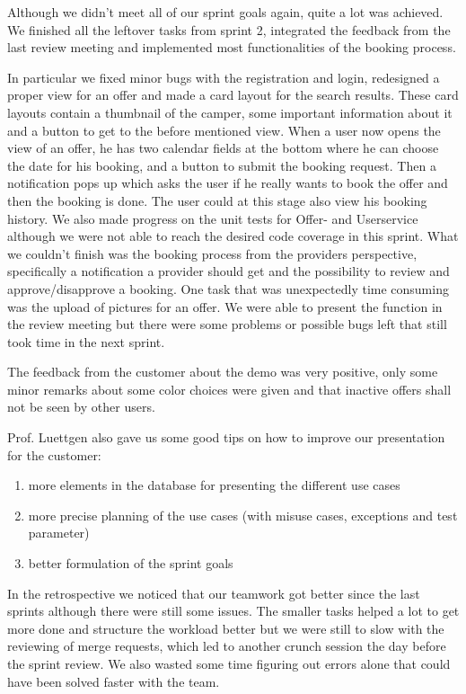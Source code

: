 Although we didn't meet all of our sprint goals again, quite a lot was achieved.
We finished all the leftover tasks from sprint 2, integrated the feedback from the last review meeting and implemented most functionalities of the booking process.

In particular we fixed minor bugs with the registration and login, redesigned a proper view for an offer and made a card layout for the search results.
These card layouts contain a thumbnail of the camper, some important information about it and a button to get to the before mentioned view.
When a user now opens the view of an offer, he has two calendar fields at the bottom where he can choose the date for his booking,
and a button to submit the booking request. Then a notification pops up which asks the user if he really wants to book the offer
and then the booking is done. The user could at this stage also view his booking history.
We also made progress on the unit tests for Offer- and Userservice although we were not able to reach the desired code coverage in this sprint.
What we couldn't finish was the booking process from the providers perspective, specifically a notification a provider should get and the possibility to review and approve/disapprove a booking.
One task that was unexpectedly time consuming was the upload of pictures for an offer. We were able to present the function
in the review meeting but there were some problems or possible bugs left that still took time in the next sprint.

The feedback from the customer about the demo was very positive, only some minor remarks about some color choices were given and that inactive offers shall not be seen by other users.

Prof. Luettgen also gave us some good tips on how to improve our presentation for the customer:
\begin{enumerate}
    \item more elements in the database for presenting the different use cases
    \item more precise planning of the use cases (with misuse cases, exceptions and test parameter)
    \item better formulation of the sprint goals
\end{enumerate}

In the retrospective we noticed that our teamwork got better since the last sprints although there were still some issues.
The smaller tasks helped a lot to get more done and structure the workload better but we were still to slow with the reviewing of merge requests, which led to another crunch session the day before the sprint review.
We also wasted some time figuring out errors alone that could have been solved faster with the team.
